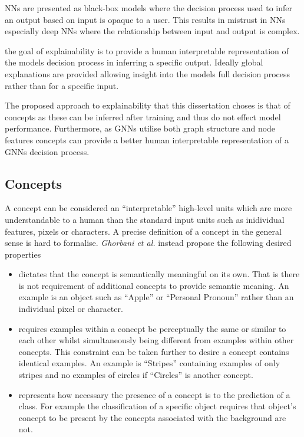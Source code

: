 


NNs are presented as black-box models where the decision process used to infer an output based on input is opaque to a user.
This results in mistrust in NNs especially deep NNs where the relationship between input and output is complex.

the goal of explainability is to provide a human interpretable representation of the models decision process in inferring a specific output.
Ideally global explanations are provided allowing insight into the models full decision process rather than for a specific input.

The proposed approach to explainability that this dissertation choses is that of concepts as these can be inferred after training and thus do not effect model performance.
Furthermore, as GNNs utilise both graph structure and node features concepts can provide a better human interpretable representation of a GNNs decision process.

\subsection{Concepts}



A concept can be considered an ``interpretable'' high-level units which are more understandable to a human than the standard input units such as inidividual features, pixels or characters.
A precise definition of a concept in the general sense is hard to formalise.
\textit{Ghorbani et al.}\cite{ghorbani2019towards} instead propose the following desired properties
\begin{itemize}
    \item[]
        dictates that the concept is semantically meaningful on its own.
        That is there is not requirement of additional concepts to provide semantic meaning.
        An example is an object such as ``Apple'' or ``Personal Pronoun'' rather than an individual pixel or character.
    \item[]
        requires examples within a concept be perceptually the same or similar to each other whilst simultaneously being different from examples within other concepts.
        This constraint can be taken further to desire a concept contains identical examples.
        An example is ``Stripes'' containing examples of only stripes and no examples of circles if ``Circles'' is another concept.
    \item[]
        represents how necessary the presence of a concept is to the prediction of a class.
        For example the classification of a specific object requires that object's concept to be present by the concepts associated with the background are not.
\end{itemize}

